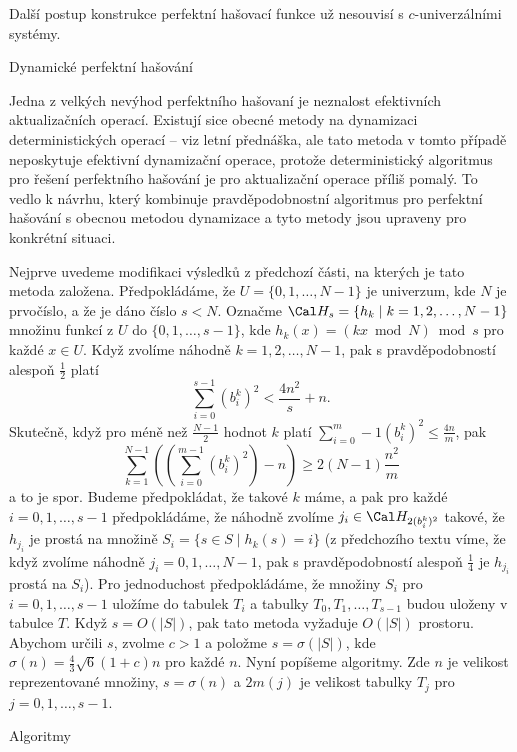 \documentclass[a4paper,12pt]{article}
\begin{document}
Další postup konstrukce perfektní hašovací funkce už 
nesouvisí s $c$-univerzálními systémy. 

\subhead
Dynamické perfektní hašování
\endsubhead

Jedna z velkých nevýhod perfektního hašovaní je 
neznalost efektivních aktualizačních ope\-rací. Existují sice 
obecné meto\-dy na dynamizaci deterministických operací -- viz 
letní přednáš\-ka, ale tato metoda v tomto případě neposkytuje 
efektivní dynamizační operace, protože deterministický 
algoritmus pro ře\-še\-ní perfektního hašování je pro 
aktualizační ope\-race příliš pomalý. To vedlo k návrhu, 
který kombinuje pravděpodobnostní algoritmus pro perfektní 
hašování s obecnou metodou dynami\-za\-ce a tyto metody jsou 
upraveny pro konkrétní situaci. 

Nejprve uvedeme modifikaci výsledků z 
předchozí části, na kterých je tato metoda založena.
Předpokládáme, že $U=\{0,1,\dots,N-1\}$ je univerzum, kde $
N$ je 
prvočíslo, a že je dáno číslo $s<N$. Označme 
$\Cal H_s=\{h_k\mid k=1,2,\dots,N-1\}$ množinu funkcí z $U$ do 
$\{0,1,\dots,s-1\}$, kde $h_k(x)=(kx\bmod N)\bmod s$ pro každé $
x\in U$. 
Když zvolíme náhodně $k=1,2,\dots,N-1$, pak s pravděpodobností 
ales\-poň $\frac 12$ platí 
$$\sum_{i=0}^{s-1}(b_i^k)^2<\frac {4n^2}s+n.$$
Skutečně, když pro méně než $\frac{N-1}2$ hodnot $k$ platí $\sum_{i=0}^m-1(b^k_i)^2\le\frac{4n}m$, pak 
$$\sum_{k=1}^{N-1}\left((\sum_{i=0}^{m-1}(b^k_i)^2)-n\right)\ge2(N-1)\frac{n^2}m$$ 
a to je spor. Budeme předpokládat, 
že takové $k$ máme, a pak pro každé $i=0,1,\dots,s-1$ 
předpokládáme, že náhodně zvolíme $j_i\in \Cal H_{
2(b_i^k)^2}$ takové, že 
$h_{j_i}$ je prostá na množině $S_i=\{s\in S\mid h_k(s)=i
\}$ (z předchozího textu víme, že když zvolíme náhodně 
$j_i=0,1,\dots,N-1$, pak s pravděpodobností ales\-poň $\frac 
14$ je $h_{j_i}$ prostá na $S_i$). Pro jednoduchost předpokládáme, že množiny $
S_i$ 
pro $i=0,1,\dots,s-1$ uložíme do tabulek $T_i$ a tabulky 
$T_0,T_1,\dots,T_{s-1}$ budou uloženy v tabulce $T$. Když $
s=O(|S|)$, 
pak tato metoda vyžaduje $O(|S|)$ prostoru. Abychom určili $
s$, 
zvolme $c>1$ a položme $s=\sigma (|S|)$, kde $\sigma (n)=\frac 
43\sqrt 6(1+c)n$ pro 
každé $n$. Nyní popíšeme algoritmy. Zde $n$ je velikost reprezentované množiny, $s=\sigma(n)$ a $2m(j)$ je velikost tabulky $T_j$ pro $j=0,1,\dots,s-1$.

\subhead
Algoritmy
\endsubhead
\bigskip
\end{document}
